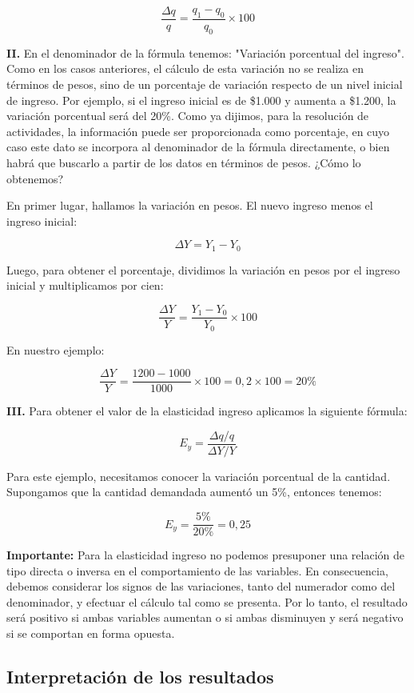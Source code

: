 \documentclass[12pt,a4paper]{article}
\begin{document}
\[
\frac{\Delta q}{q} = \frac{q_1 - q_0}{q_0} \times 100
\]

\textbf{II.} En el denominador de la fórmula tenemos: "Variación porcentual del ingreso". Como en los casos anteriores, el cálculo de esta variación no se realiza en términos de pesos, sino de un porcentaje de variación respecto de un nivel inicial de ingreso. Por ejemplo, si el ingreso inicial es de \$1.000 y aumenta a \$1.200, la variación porcentual será del 20\%. Como ya dijimos, para la resolución de actividades, la información puede ser proporcionada como porcentaje, en cuyo caso este dato se incorpora al denominador de la fórmula directamente, o bien habrá que buscarlo a partir de los datos en términos de pesos. ¿Cómo lo obtenemos?

En primer lugar, hallamos la variación en pesos. El nuevo ingreso menos el ingreso inicial:

\[
\Delta Y = Y_1 - Y_0
\]

Luego, para obtener el porcentaje, dividimos la variación en pesos por el ingreso inicial y multiplicamos por cien:

\[
\frac{\Delta Y}{Y} = \frac{Y_1 - Y_0}{Y_0} \times 100
\]

En nuestro ejemplo:

\[
\frac{\Delta Y}{Y} = \frac{1200 - 1000}{1000} \times 100 = 0,2 \times 100 = 20\%
\]

\textbf{III.} Para obtener el valor de la elasticidad ingreso aplicamos la siguiente fórmula:

\[
E_y = \frac{\Delta q / q}{\Delta Y / Y}
\]

Para este ejemplo, necesitamos conocer la variación porcentual de la cantidad. Supongamos que la cantidad demandada aumentó un 5\%, entonces tenemos:

\[
E_y = \frac{5\%}{20\%} = 0,25
\]

\textbf{Importante:} Para la elasticidad ingreso no podemos presuponer una relación de tipo directa o inversa en el comportamiento de las variables. En consecuencia, debemos considerar los signos de las variaciones, tanto del numerador como del denominador, y efectuar el cálculo tal como se presenta. Por lo tanto, el resultado será positivo si ambas variables aumentan o si ambas disminuyen y será negativo si se comportan en forma opuesta.

\subsection{Interpretación de los resultados}
\end{document}
